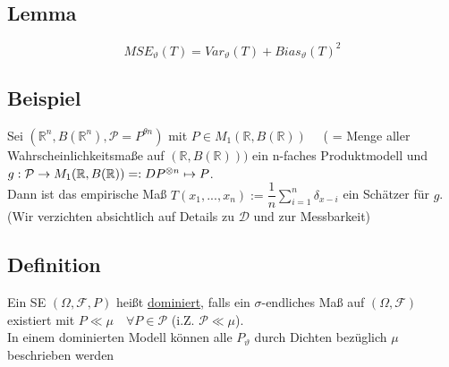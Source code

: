 \documentclass[german,10pt,oneside, fleqn, a4paper]{article}
\newcommand {\R}	{\mathbb{R}}
\newcommand{\ra}{\rightarrow}
\newcommand{\sm}[2][\infty]{\sum\limits_{#2}^{#1}}
\newcommand{\brc}[1]{\left(#1\right)}
\newcommand{\mc}[1]{\mathcal{#1}}
\newcommand{\1}[1]{1_{#1}}
\newcommand{\2}[1]{\1{\brac{#1}}}
\newcommand{\raum}{\brc{\Omega,\mc{F},P}}
\newcommand{\f}{\mc{F}}
\newcommand{\p}{\mc{P}}
\newcommand{\sumi}{\sm[n]{i=1}}
\newcommand{\qf}{\quad\forall}
\newcommand{\stuff}{{\otimes n}}
\begin{document}
\subsection{Lemma}
\label{9.4}
\[MSE_\vartheta(T)=Var_\vartheta(T)+Bias_\vartheta(T)^2\]

\subsection{Beispiel}
\label{9.5}
Sei $(\R^n,B(\R^n),\p=P^{\theta n})$ mit $P\in M_1(\R,B(\R))\quad$ ( = Menge aller Wahrscheinlichkeitsmaße auf $(\R,B(\R)))$ ein n-faches Produktmodell und \\
$g:\p\ra M_1(\R,B(\R))=:D\\
P^\stuff\mapsto P$.\\
Dann ist das empirische Maß $T(x_1,...,x_n):=\dfrac{1}{n}\sumi\delta_{x-i}$ ein Schätzer für $g$. (Wir verzichten absichtlich auf Details zu $\mc{D}$ und zur Messbarkeit)

\subsection{Definition}
\label{9.6}
Ein SE $\raum$ heißt \underline{dominiert}, falls ein $\sigma$-endliches Maß auf $(\Omega,\f)$ existiert mit $P\ll\mu\qf P\in\p$ (i.Z. $\p\ll\mu$).\\
In einem dominierten Modell können alle $P_\vartheta$ durch Dichten bezüglich $\mu$ beschrieben werden
\end{document}
